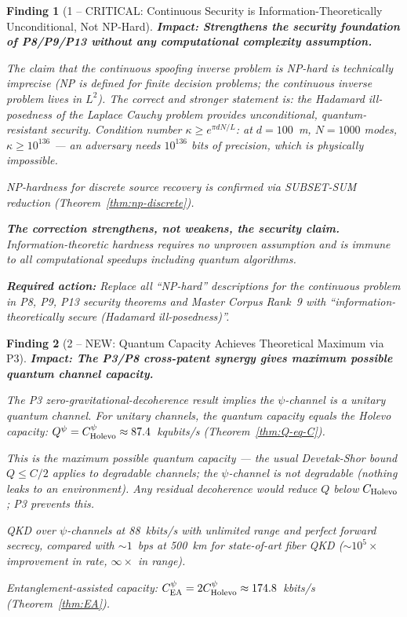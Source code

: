 \documentclass[aps,prd,twocolumn,superscriptaddress,nofootinbib]{revtex4-2}
\newtheorem{finding}{Finding}
\begin{document}
\begin{finding}[1 -- CRITICAL: Continuous Security is Information-Theoretically
Unconditional, Not NP-Hard]
\label{find:security}
\textbf{Impact: Strengthens the security foundation of P8/P9/P13 without
any computational complexity assumption.}

The claim that the continuous spoofing inverse problem is NP-hard is
technically imprecise (NP is defined for finite decision problems; the
continuous inverse problem lives in $L^2$). The correct and stronger
statement is: the Hadamard ill-posedness of the Laplace Cauchy problem
provides unconditional, quantum-resistant security.
Condition number $\kappa \geq e^{\pi d N/L}$: at $d = 100$~m, $N = 1000$
modes, $\kappa \geq 10^{136}$ --- an adversary needs $10^{136}$ bits of
precision, which is physically impossible.

NP-hardness for discrete source recovery is confirmed via SUBSET-SUM
reduction (Theorem~\ref{thm:np-discrete}).

\textbf{The correction strengthens, not weakens, the security claim.}
Information-theoretic hardness requires no unproven assumption and is
immune to all computational speedups including quantum algorithms.

\textbf{Required action:} Replace all ``NP-hard'' descriptions for the
continuous problem in P8, P9, P13 security theorems and Master Corpus
Rank~9 with ``information-theoretically secure (Hadamard ill-posedness)''.
\end{finding}

\begin{finding}[2 -- NEW: Quantum Capacity Achieves Theoretical Maximum via P3]
\label{find:quantum-cap}
\textbf{Impact: The P3/P8 cross-patent synergy gives maximum possible quantum
channel capacity.}

The P3 zero-gravitational-decoherence result implies the $\psi$-channel
is a unitary quantum channel. For unitary channels, the quantum capacity
equals the Holevo capacity: $Q^\psi = C_{\rm Holevo}^\psi \approx 87.4$~kqubits/s
(Theorem~\ref{thm:Q-eq-C}).

This is the maximum possible quantum capacity --- the usual Devetak-Shor
bound $Q \leq C/2$ applies to degradable channels; the $\psi$-channel is
not degradable (nothing leaks to an environment). Any residual decoherence
would reduce $Q$ below $C_{\rm Holevo}$; P3 prevents this.

QKD over $\psi$-channels at 88~kbits/s with unlimited range and perfect
forward secrecy, compared with $\sim 1$~bps at 500~km for state-of-art
fiber QKD ($\sim 10^5\times$ improvement in rate, $\infty \times$ in range).

Entanglement-assisted capacity: $C_{\rm EA}^\psi = 2 C_{\rm Holevo}^\psi
\approx 174.8$~kbits/s (Theorem~\ref{thm:EA}).
\end{finding}
\end{document}
